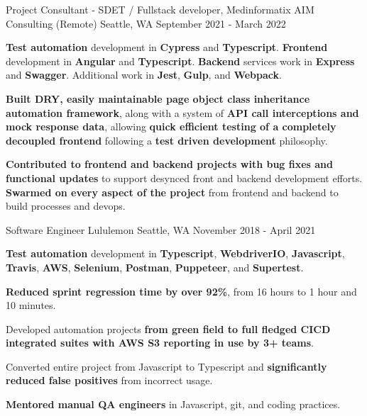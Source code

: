 \begin{cventries}
\cventry
{Project Consultant - SDET / Fullstack developer, Medinformatix} %
{AIM Consulting (Remote)} %
{Seattle, WA} %
{September 2021 - March 2022} %
{
\begin{cvitems}
\item {\textbf{Test automation} development in \textbf{Cypress} and \textbf{Typescript}. \textbf{Frontend} development in \textbf{Angular} and \textbf{Typescript}. \textbf{Backend} services work in \textbf{Express} and \textbf{Swagger}. Additional work in \textbf{Jest}, \textbf{Gulp}, and \textbf{Webpack}.}
\item {\textbf{Built DRY, easily maintainable page object class inheritance automation framework}, along with a system of \textbf{API call interceptions and mock response data}, allowing \textbf{quick efficient testing of a completely decoupled frontend} following a \textbf{test driven development} philosophy.}
\item {\textbf{Contributed to frontend and backend projects with bug fixes and functional updates} to support desynced front and backend development efforts. \textbf{Swarmed on every aspect of the project} from frontend and backend to build processes and devops.}
\end{cvitems}
}

\cventry
{Software Engineer} %
{Lululemon} %
{Seattle, WA} %
{November 2018 - April 2021} %
{
\begin{cvitems}
\item {\textbf{Test automation} development in \textbf{Typescript}, \textbf{WebdriverIO}, \textbf{Javascript}, \textbf{Travis}, \textbf{AWS}, \textbf{Selenium}, \textbf{Postman}, \textbf{Puppeteer}, and \textbf{Supertest}.}
\item {\textbf{Reduced sprint regression time by over 92\%}, from 16 hours to 1 hour and 10 minutes.}
\item {Developed automation projects \textbf{from green field to full fledged CICD integrated suites with AWS S3 reporting in use by 3+ teams}.}
\item {Converted entire project from Javascript to Typescript and \textbf{significantly reduced false positives} from incorrect usage.}
\item {\textbf{Mentored manual QA engineers} in Javascript, git, and coding practices.}
\end{cvitems}
}


\end{cventries}
